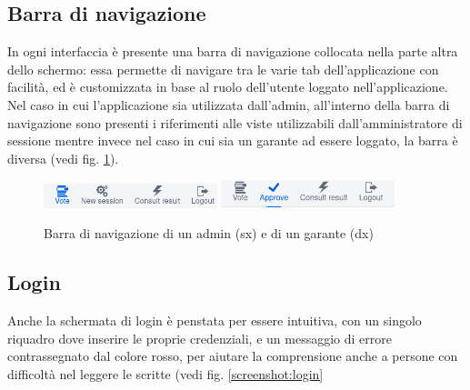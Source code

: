 \subsection{Barra di navigazione}
In ogni interfaccia è presente una barra di navigazione collocata nella parte altra dello schermo: essa permette di navigare tra le varie tab dell'applicazione con facilità, ed è customizzata in base al ruolo dell'utente loggato nell'applicazione. 
Nel caso in cui l'applicazione sia utilizzata dall'admin, all'interno della barra di navigazione sono presenti i riferimenti alle viste utilizzabili dall'amministratore di sessione mentre invece nel caso in cui sia un garante ad essere loggato, la barra è diversa (vedi fig. \ref{screenshot:mainview}).
\begin{figure}
	\centering
	\includegraphics[width=0.45\textwidth]{img/gui/adminMainView.png}
	\includegraphics[width=0.45\textwidth]{img/gui/guarantorsMainView.png}
	\caption{Barra di navigazione di un admin (sx) e di un garante (dx)}
	\label{screenshot:mainview}
\end{figure}

\subsection{Login}
Anche la schermata di login è penstata per essere intuitiva, con un singolo riquadro dove inserire le proprie credenziali, e un messaggio di errore contrassegnato dal colore rosso, per aiutare la comprensione anche a persone con difficoltà nel leggere le scritte (vedi fig. \ref{screenshot:login}


